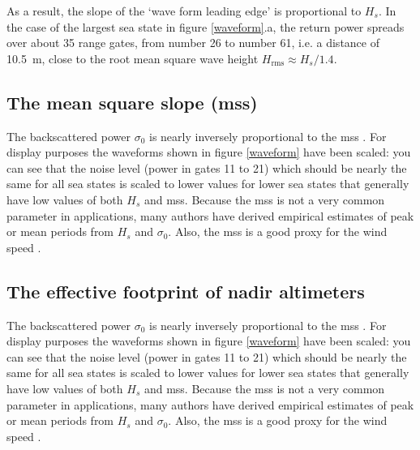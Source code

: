 As a result, 
the slope of the `wave form leading edge' is proportional to  $H_s$.  
In the case of the largest sea state in figure \ref{waveform}.a, the return 
power spreads over about 35 range gates, from number 26 to number 61, i.e. a distance of 10.5~m, close to the root mean square wave height
 $H_{\mathrm{rms}} \approx  H_{s}/1.4$. %

\subsection{The mean square slope (mss)}
The backscattered power $\sigma_0$ is nearly inversely proportional to the mss \citep{Vandemark&al.2002}. 
For display purposes the waveforms shown in figure \ref{waveform} have been scaled: you can see that the noise level (power in gates 11 to 21) which should be nearly the same for 
all sea states is scaled to lower values for lower sea states that generally have low values of both $H_s$ and mss.  
Because the mss is not a very common parameter in applications, many authors have derived empirical estimates of peak or mean  periods from $H_s$ and $\sigma_0$. Also, the mss is a good proxy for the wind speed \citep{Cox&Munk1954}.




\subsection{The effective footprint of nadir altimeters}
The backscattered power $\sigma_0$ is nearly inversely proportional to the mss \citep{Vandemark&al.2002}. 
For display purposes the waveforms shown in figure \ref{waveform} have been scaled: you can see that the noise level (power in gates 11 to 21) which should be nearly the same for 
all sea states is scaled to lower values for lower sea states that generally have low values of both $H_s$ and mss.  
Because the mss is not a very common parameter in applications, many authors have derived empirical estimates of peak or mean  periods from $H_s$ and $\sigma_0$. Also, the mss is a good proxy for the wind speed \citep{Cox&Munk1954}.



